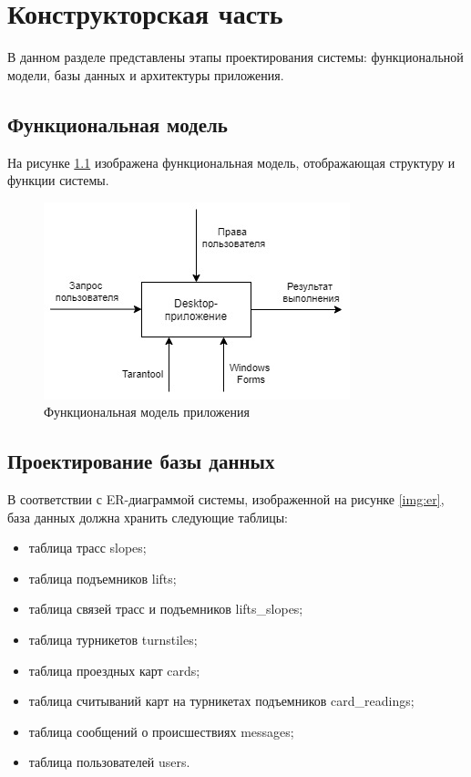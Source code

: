 \chapter{Конструкторская часть}

В данном разделе представлены этапы проектирования системы: функциональной модели, базы данных и архитектуры приложения.

\section{Функциональная модель}

На рисунке \ref{img:func_model} изображена функциональная модель, отображающая структуру и функции системы.

\begin{figure}[h!]
	\begin{center}
		\includegraphics[scale=0.6]{../imgs/func_model.jpg}
	\end{center}
	\captionsetup{justification=centering}
	\caption{Функциональная модель приложения}
	\label{img:func_model}
\end{figure}









\section{Проектирование базы данных}


В соответствии с ER-диаграммой системы, изображенной на рисунке \ref{img:er}, база данных должна хранить следующие таблицы:  


\begin{itemize}
	\item таблица трасс slopes;
	\item таблица подъемников lifts;
	\item таблица связей трасс и подъемников lifts\_slopes;
	\item таблица турникетов turnstiles;
	\item таблица проездных карт cards;
	\item таблица считываний карт на турникетах подъемников card\_readings;
	\item таблица сообщений о происшествиях messages;
	\item таблица пользователей users.
\end{itemize}


